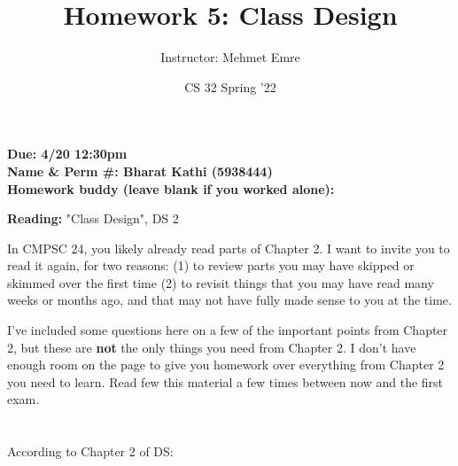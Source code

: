 \documentclass[11pt]{article}
\author{Instructor: Mehmet Emre}
\date{CS 32 Spring '22}
\title{Homework 5: Class Design}
\begin{document}
\maketitle
\textbf{Due: 4/20 12:30pm} \\ 
\vspace{1em}
\textbf{Name \& Perm \#: Bharat Kathi (5938444)} \\ 
\textbf{Homework buddy (leave blank if you worked alone):}

\vspace{1em}
\textbf{Reading:} "Class Design", DS 2

In CMPSC 24, you likely already read parts of Chapter 2. I want to
invite you to read it again, for two reasons: (1) to review parts you
may have skipped or skimmed over the first time (2) to revisit things
that you may have read many weeks or months ago, and that may not have
fully made sense to you at the time.

I've included some questions here on a few of the important points
from Chapter 2, but these are \textbf{not} the only things you need from
Chapter 2. I don't have enough room on the page to give you homework
over everything from Chapter 2 you need to learn. Read few this
material a few times between now and the first exam.

\section{}
\label{sec:org6d9f545}

According to Chapter 2 of DS:
\end{document}
